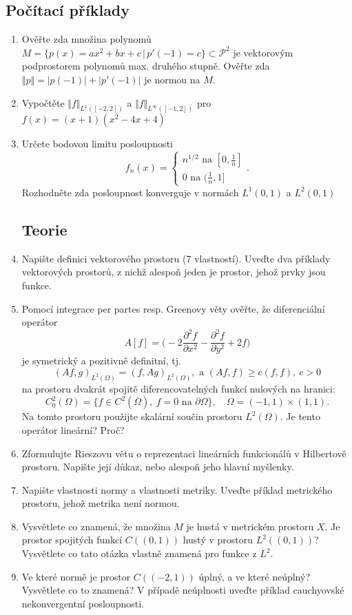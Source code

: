\documentclass[a4paper,10pt]{article}
\def\abs#1{\lvert#1\rvert}
\def\norm#1{\bigl\Vert#1\bigr\Vert} %
\def\close#1{\overline{#1}}
\def\where{\,|\,}                    %
\def\prtl{\partial}                                        %
\begin{document}
\subsection{Počítací příklady}
\begin{enumerate}
\item Ověřte zda množina polynomů $M=\{p(x)=ax^2+bx+c\where p'(-1)=c\}\subset \mathcal P^2$ je vektorovým podprostorem polynomů max. druhého stupně.
 Ověřte zda $\norm{p}=\abs{p(-1)}+\abs{p'(-1)}$ je normou na $M$.
 \item Vypočtěte $\norm{f}_{L^1([-2,2])}$ a $\norm{f}_{L^\infty([-1,2])}$ pro $f(x)=(x+1)(x^2-4x+4)$
 \item Určete bodovou limitu posloupnosti
 		\[f_n(x)=
                \left\{\begin{aligned}
                        n^{1/2} \text{ na $[0,\frac1n]$}\\
                        0 \text{ na $(\frac1n,1]$}
                       \end{aligned}\right. .
               \]
        Rozhodněte zda posloupnost konverguje  v normách $L^1{(0,1)}$ a $L^2{(0,1)}$

\subsection{Teorie}
\item Napište definici vektorového prostoru (7 vlastností). Uveďte dva příklady vektorových prostorů, z nichž alespoň jeden je prostor,
jehož prvky jsou funkce.

\item  Pomocí integrace per partes resp. Greenovy věty ověřte, že diferenciální operátor 
\[
A[f]=\big(-2\frac{\prtl^2 f}{\prtl x^2} -\frac{\prtl^2 f}{\prtl y^2} +  2f\big)
\]
je symetrický a pozitivně definitní, tj. 
\[
    (Af,g)_{L^2(\Omega)}=(f,Ag)_{L^2(\Omega)},\text{ a } (Af,f) \ge c(f,f),\ c>0
\]
na prostoru dvakrát spojitě diferencovatelných funkcí nulových na hranici:
\[
C^2_0(\Omega)=\{ f\in C^2(\close{\Omega}),\ f=0 \text{ na }\prtl\Omega\},\quad \Omega=(-1,1)\times(1,1).
\]
Na tomto prostoru použijte skalární součin prostoru $L^2(\Omega)$. Je tento operátor lineární? Proč?

\item Zformulujte Rieszovu větu o reprezentaci lineárních funkcionálů v Hilbertově prostoru. Napište její důkaz, nebo alespoň jeho hlavní myšlenky.

\item Napište vlastnosti normy a vlastnosti metriky. Uveďte příklad metrického prostoru, jehož metrika není normou.

\item Vysvětlete co znamená, že množina $M$ je hustá v metrickém prostoru $X$. Je prostor spojitých funkcí $C((0,1))$ hustý v prostoru $L^2((0,1))$? Vysvětlete co tato otázka vlastně znamená pro funkce z $L^2$.

\item Ve které normě je prostor $C((-2,1))$ úplný, a ve které neúplný? Vysvětlete co to znamená? V případě neúplnosti uveďte příklad cauchyovské nekonvergentní posloupnosti.
\end{enumerate}
\end{document}
